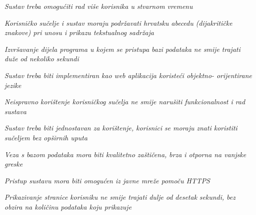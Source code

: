 			\begin{packed_item}

				\item \textit{Sustav treba omogućiti rad više korisnika u stvarnom vremenu}
				\item \textit{Korisničko sučelje i sustav moraju podržavati hrvatsku abecedu (dijakritičke
				znakove) pri unosu i prikazu tekstualnog sadržaja}
				\item \textit{Izvršavanje dijela programa u kojem se pristupa bazi podataka ne smije trajati
				duže od nekoliko sekundi}
				\item \textit{Sustav treba biti implementiran kao web aplikacija koristeći
				objektno- orijentirane jezike}
				\item \textit{Neispravno korištenje korisničkog sučelja ne smije narušiti funkcionalnost i
				rad sustava}
				\item \textit{Sustav treba biti jednostavan za korištenje, korisnici se moraju znati koristiti
				sučeljem bez opširnih uputa}
				\item \textit{Veza s bazom podataka mora biti kvalitetno zaštičena, brza i otporna na
				vanjske greske}
				\item \textit{Pristup sustavu mora biti omogućen iz javne mreže pomoču HTTPS}
				\item \textit{Prikazivanje stranice korisniku ne smije trajati dulje od desetak sekundi,
				bez obzira na količinu podataka koju prikazuje}

			\end{packed_item}
			 
	